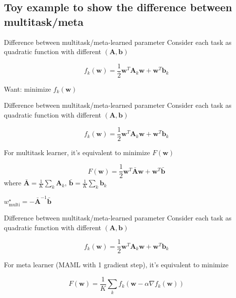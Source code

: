 \documentclass{beamer}
\begin{document}
\subsection{Toy example to show the difference between multitask/meta}
\begin{frame}[t]{Difference between multitask/meta-learned parameter}
\label{another example}
  Consider each task as quadratic function with different $(\mathbf{A}, \mathbf{b})$

  \begin{equation*}
    f_k(\mathbf{w}) = \frac{1}{2} \mathbf{w}^T \mathbf{A}_k \mathbf{w} + \mathbf{w}^T \mathbf{b}_k
  \end{equation*}

  Want: minimize $f_k(\mathbf{w})$
\end{frame}

\begin{frame}[t]{Difference between multitask/meta-learned parameter}
  Consider each task as quadratic function with different $(\mathbf{A}, \mathbf{b})$

  \begin{equation*}
    f_k(\mathbf{w}) = \frac{1}{2} \mathbf{w}^T \mathbf{A}_k \mathbf{w} + \mathbf{w}^T \mathbf{b}_k
  \end{equation*}

  For multitask learner, it's equivalent to minimize $F(\mathbf{w})$

  \begin{equation*}
    F(\mathbf{w}) =  \frac{1}{2} \mathbf{w}^T \bar{\mathbf{A}} \mathbf{w} + \mathbf{w}^T \bar{\mathbf{b}}
  \end{equation*}
  where $\bar{\mathbf{A}} = \frac{1}{K}\sum_k \mathbf{A}_k$, $\bar{\mathbf{b}} = \frac{1}{K}\sum_k \mathbf{b}_k$

  \center $\boxed{w^\star_{\text{multi}} = - \bar{\mathbf{A}}^{-1}\bar{\mathbf{b}}}$
\end{frame}
\begin{frame}[t]{Difference between multitask/meta-learned parameter}
  Consider each task as quadratic function with different $(\mathbf{A}, \mathbf{b})$

  \begin{equation*}
    f_k(\mathbf{w}) = \frac{1}{2} \mathbf{w}^T \mathbf{A}_k \mathbf{w} + \mathbf{w}^T \mathbf{b}_k
  \end{equation*}

  For meta learner (MAML with 1 gradient step), it's equivalent to minimize

  \begin{equation*}
    F(\mathbf{w}) =  \frac{1}{K} \sum_k f_k(\mathbf{w} - \alpha \nabla f_k(\mathbf{w})) 
  \end{equation*}
\end{frame}
\end{document}
